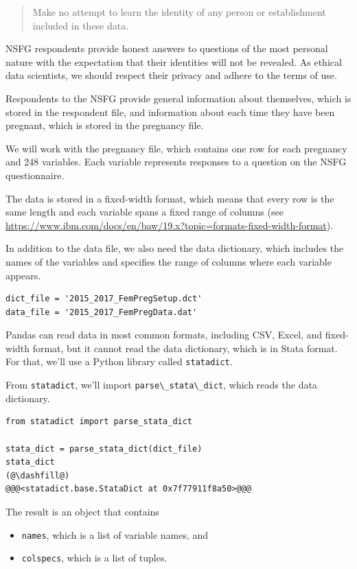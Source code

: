 \begin{quote}
Make no attempt to learn the identity of any person or establishment
included in these data.
\end{quote}

NSFG respondents provide honest answers to questions of the most
personal nature with the expectation that their identities will not be
revealed. As ethical data scientists, we should respect their privacy
and adhere to the terms of use.

Respondents to the NSFG provide general information about themselves,
which is stored in the respondent file, and information about each time
they have been pregnant, which is stored in the pregnancy file.

We will work with the pregnancy file, which contains one row for each
pregnancy and 248 variables. Each variable represents responses to a
question on the NSFG questionnaire.

The data is stored in a fixed-width format, which means that every row
is the same length and each variable spans a fixed range of columns (see
\url{https://www.ibm.com/docs/en/baw/19.x?topic=formats-fixed-width-format}).

In addition to the data file, we also need the data dictionary, which
includes the names of the variables and specifies the range of columns
where each variable appears.

\begin{lstlisting}[]
dict_file = '2015_2017_FemPregSetup.dct'
data_file = '2015_2017_FemPregData.dat'
\end{lstlisting}

Pandas can read data in most common formats, including CSV, Excel, and
fixed-width format, but it cannot read the data dictionary, which is in
Stata format. For that, we'll use a Python library called
\passthrough{\lstinline!statadict!}.

From \passthrough{\lstinline!statadict!}, we'll import
\passthrough{\lstinline!parse\_stata\_dict!}, which reads the data
dictionary.

\begin{lstlisting}[]
from statadict import parse_stata_dict

stata_dict = parse_stata_dict(dict_file)
stata_dict
(@\dashfill@)
@@@<statadict.base.StataDict at 0x7f77911f8a50>@@@
\end{lstlisting}

The result is an object that contains

\begin{itemize}
\item
  \passthrough{\lstinline!names!}, which is a list of variable names,
  and
\item
  \passthrough{\lstinline!colspecs!}, which is a list of tuples.
\end{itemize}

